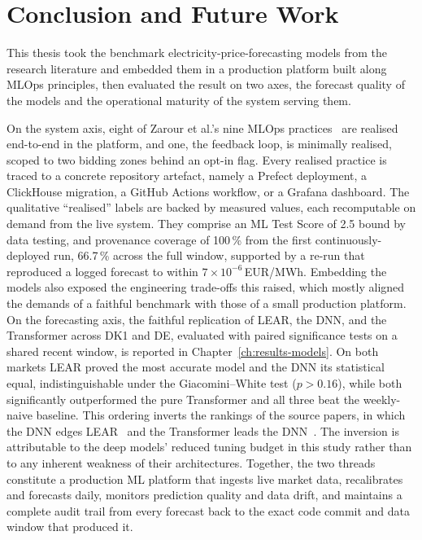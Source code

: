\chapter{Conclusion and Future Work}
\label{ch:conclusion}

This thesis took the benchmark electricity-price-forecasting models from the
research literature and embedded them in a production platform built
along MLOps principles, then evaluated the result on two axes, the forecast
quality of the models and the operational maturity of the system serving them.

On the system axis, eight of Zarour et al.'s nine MLOps
practices~\cite{zarour2025} are realised end-to-end in the platform, and one,
the feedback loop, is minimally realised, scoped to two bidding zones behind an
opt-in flag. Every realised practice is traced to a concrete repository artefact, namely
a Prefect deployment, a ClickHouse migration, a GitHub Actions workflow, or a
Grafana dashboard. The qualitative ``realised'' labels are backed by measured
values, each recomputable on demand from the live system. They comprise an ML
Test Score of 2.5 bound by data testing, and provenance coverage of
100\,\% from the first continuously-deployed run, 66.7\,\% across the full
window, supported by a re-run that reproduced a logged forecast to within
$7\times10^{-6}$\,EUR/MWh. Embedding the models also exposed the engineering
trade-offs this raised, which mostly aligned the demands of a faithful benchmark
with those of a small production platform. On the forecasting axis, the faithful replication of LEAR, the DNN,
and the Transformer across DK1 and DE, evaluated with paired significance tests
on a shared recent window, is reported in Chapter~\ref{ch:results-models}.
On both markets LEAR proved the most accurate model and the DNN its statistical
equal, indistinguishable under the Giacomini--White test ($p>0.16$), while both
significantly outperformed the pure Transformer and all three beat the
weekly-naive baseline. This ordering inverts the rankings of the source papers,
in which the DNN edges LEAR~\cite{lago2021} and the Transformer leads the
DNN~\cite{llorente2025transformer}. The inversion is attributable to the deep
models' reduced tuning budget in this study rather than to any inherent weakness
of their architectures.
Together, the two threads constitute a production ML platform that ingests live
market data, recalibrates and forecasts daily, monitors prediction quality and
data drift, and maintains a complete audit trail from every forecast back to the
exact code commit and data window that produced it.


